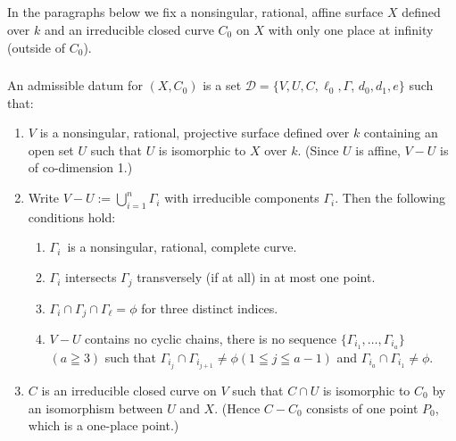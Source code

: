 \subsection{}\label{chap2:1.2}
In the paragraphs below we fix a nonsingular, rational, affine surface
$X$ defined over $k$ and an irreducible closed curve $C_{0}$ on $X$
with only one place at infinity (\iec outside of $C_{0}$).

\subsubsection{}\label{chap2:1.2.1}
\begin{defi*}
  An admissible datum for $(X,C_{0})$ is a set
  $\mathscr{D}=\{V,U,C,\ell_{0},\Gamma$, $d_{0},d_{1},e\}$ such that:
  \begin{enumerate}
    \renewcommand{\labelenumi}{\rm(\theenumi)}
  \item $V$ is a nonsingular, rational, projective surface defined over
    $k$ containing an open set $U$ such that $U$ is isomorphic to $X$
    over $k$. (Since $U$ is affine, $V-U$ is of co-dimension 1.)
    
  \item Write
    $V-U:={\displaystyle{\mathop{\bigcup}^{n}_{i=1}}}\Gamma_{i}$ with
    irreducible components $\Gamma_{i}$. Then the following conditions hold:
    \begin{enumerate}
      \renewcommand{\theenumii}{\roman{enumii}}
      \renewcommand{\labelenumii}{\rm(\theenumii)}
    \item $\Gamma_{i}$\pageoriginale\ is a nonsingular, rational, complete
      curve.
      
    \item $\Gamma_{i}$ intersects $\Gamma_{j}$ transversely (if at all)
      in at most one point.
      
    \item $\Gamma_{i}\cap \Gamma_{j}\cap \Gamma_{\ell}=\phi$ for three
      distinct indices.
      
    \item $V-U$ contains no cyclic chains, \iec there is no sequence
      $\{\Gamma_{i_{1}},\ldots,\Gamma_{i_{a}}\}$ $(a\geqq 3)$ such that
      $\Gamma_{i_{j}}\cap \Gamma_{i_{j+1}}\neq \phi(1\leqq j\leqq a-1)$
      and $\Gamma_{i_{a}}\cap \Gamma_{i_{1}}\neq \phi$.
    \end{enumerate}
    
  \item $C$ is an irreducible closed curve on $V$ such that $C\cap U$ is
    isomorphic to $C_{0}$ by an isomorphism between $U$ and $X$. (Hence
    $C-C_{0}$ consists of one point $P_{0}$, which is a one-place
    point.)
    

\end{enumerate}
\end{defi*}
